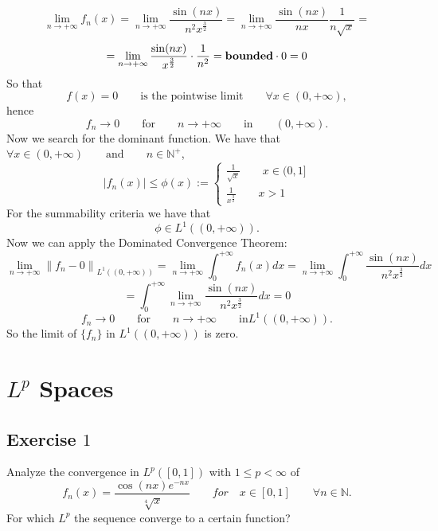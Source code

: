 \documentclass[a4paper, twoside, openany]{book}
\newcommand{\N}{\mathbb{N}}
\newcommand{\norm}[1]{\left\lVert#1\right\rVert}
\begin{document}
$$\lim_{n \rightarrow + \infty} f_n(x) = \lim_{n \rightarrow +\infty} \frac{\sin(n x)}{n^2 x^{\frac{3}{2}}} = \lim_{n \rightarrow +\infty} \frac{\sin (n x)}{n x} \frac{1}{n \sqrt{x}} =$$
$$= \lim_{n \rightarrow + \infty} \frac{\sin (n x)}{x^{\frac{3}{2}}}  \cdot \frac{1}{n^2} = \textrm{\textbf{bounded}} \cdot 0 = 0$$
So that 
$$f(x) = 0 \qquad \textrm{is the pointwise limit} \qquad \forall x \in (0, +\infty),$$
hence
$$f_n \rightarrow 0 \qquad \textrm{for} \qquad n \rightarrow +\infty \qquad \textrm{in} \qquad (0, +\infty).$$
Now we search for the dominant function. We have that $\forall x \in (0, +\infty) \qquad \textrm{and} \qquad n \in \N^+$,
$$|f_n(x)| \leq \phi(x) := \begin{cases}
							\frac{1}{\sqrt{x}} \qquad x \in (0, 1] \\
							\frac{1}{x^{\frac{3}{2}}} \qquad x > 1
						  \end{cases}$$
For the summability criteria we have that 
$$\phi \in L^1((0, +\infty)).$$
Now we can apply the Dominated Convergence Theorem:
$$\lim_{n \rightarrow +\infty} \norm{f_n - 0}_{L^1((0, +\infty))} = \lim_{n \rightarrow +\infty} \int_0^{+\infty} f_n(x) dx = \lim_{n \rightarrow + \infty} \int_0^{+\infty} \frac{\sin(n x)}{n^2 x^{\frac{3}{2}}} dx $$
$$= \int_0^{+\infty} \lim_{n \rightarrow +\infty} \frac{\sin(n x)}{n^2 x^{\frac{3}{2}}} dx = 0$$
$$f_n \rightarrow 0 \qquad \textrm{for} \qquad n \rightarrow +\infty \qquad \textrm{in} L^1((0, +\infty)).$$
So the limit of $\{ f_n \}$ in $L^1((0, +\infty))$ is zero.
\clearpage
\chapter{$L^p$ Spaces}
\section*{Exercise $1$}
Analyze the convergence in $L^p([0, 1])$ with $1 \leq p < \infty$ of
$$f_n(x) = \frac{\cos(nx) e^{-n x}}{\sqrt[4]{x}} \qquad for \quad x \in [0, 1] \qquad \forall n \in \mathbb{N}.$$
For which $L^p$ the sequence converge to a certain function?
\end{document}
